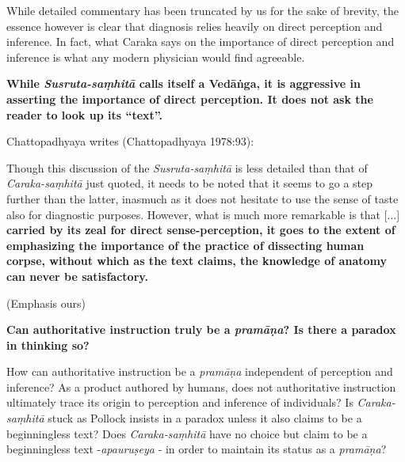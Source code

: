 While detailed commentary has been truncated by us for the sake of brevity, the essence however is clear that diagnosis relies heavily on direct perception and inference.  In fact, what Caraka says on the importance of direct perception and inference is what any modern physician would find agreeable.

{\bf While {{\sl\bfseries Susruta-saṃhitā}\relax} calls itself a Vedāṅga, it is aggressive in asserting the importance of direct perception. It does not ask the reader to look up its ``text''.}

Chattopadhyaya writes (Chattopadhyaya 1978:93):
\begin{myquote}
Though this discussion of the {\sl Susruta-saṃhitā} is less detailed than that of {\sl Caraka-saṃhitā} just quoted, it needs to be noted that it seems to go a step further than the latter, inasmuch as it does not hesitate to use the sense of taste also for diagnostic purposes.  However, what is much more remarkable is that [...] {\bf carried by its zeal for direct sense-perception, it goes to the extent of emphasizing the importance of the practice of dissecting human corpse, without which as the text claims, the knowledge of anatomy can never be satisfactory.}

\hfill (Emphasis ours)
\end{myquote}

{\bf Can authoritative instruction truly be a {{\sl\bfseries pramāṇa}\relax}?  Is there a paradox in thinking so?}

How can authoritative instruction be a {\sl pramāṇa} independent of perception and inference? As a product authored by humans, does not authoritative instruction ultimately trace its origin to perception and inference of individuals? Is {\sl Caraka-saṃhitā} stuck as Pollock insists in a paradox unless it also claims to be a beginningless text?  Does {\sl Caraka-saṃhitā} have no choice but claim to be a beginningless text -{\sl apauruṣeya} - in order to maintain its status as a {\sl pramāṇa}?

